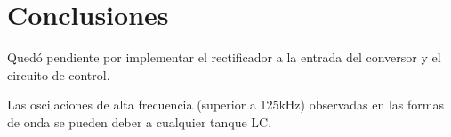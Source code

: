 \section{Conclusiones}



Quedó pendiente por implementar el rectificador a la entrada del conversor y el circuito de control.

Las oscilaciones de alta frecuencia (superior a 125kHz) observadas en las formas de onda se pueden deber a cualquier tanque LC. 